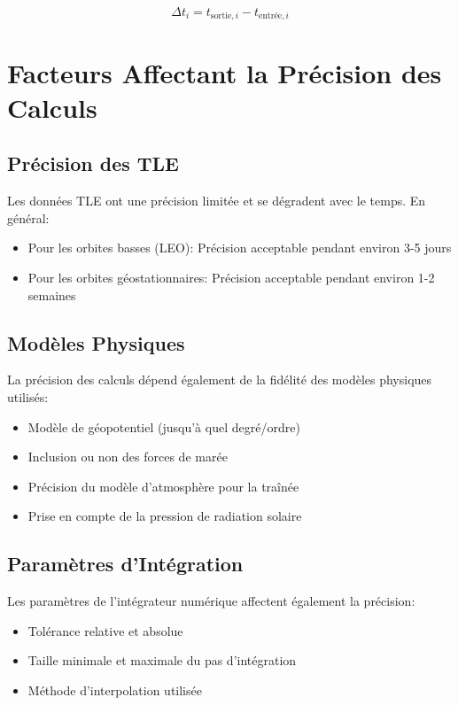 \documentclass[12pt,a4paper]{article}
\begin{document}
\begin{equation}
\Delta t_i = t_{\text{sortie},i} - t_{\text{entrée},i}
\end{equation}

\section{Facteurs Affectant la Précision des Calculs}

\subsection{Précision des TLE}

Les données TLE ont une précision limitée et se dégradent avec le temps. En général:
\begin{itemize}
    \item Pour les orbites basses (LEO): Précision acceptable pendant environ 3-5 jours
    \item Pour les orbites géostationnaires: Précision acceptable pendant environ 1-2 semaines
\end{itemize}

\subsection{Modèles Physiques}

La précision des calculs dépend également de la fidélité des modèles physiques utilisés:
\begin{itemize}
    \item Modèle de géopotentiel (jusqu'à quel degré/ordre)
    \item Inclusion ou non des forces de marée
    \item Précision du modèle d'atmosphère pour la traînée
    \item Prise en compte de la pression de radiation solaire
\end{itemize}

\subsection{Paramètres d'Intégration}

Les paramètres de l'intégrateur numérique affectent également la précision:
\begin{itemize}
    \item Tolérance relative et absolue
    \item Taille minimale et maximale du pas d'intégration
    \item Méthode d'interpolation utilisée
\end{itemize}
\end{document}
